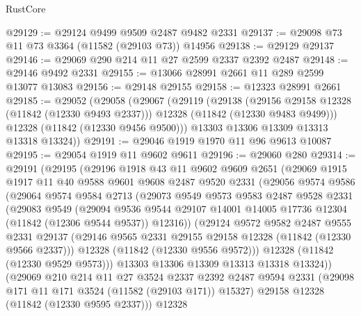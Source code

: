 \begin{lexlean}{RustCore}
\begin{coremodule}
@29129 := @29124 @9499 @9509 @2487 @9482 @2331
@29137 := @29098 @73 @11 @73 @3364 (@11582 (@29103 @73)) @14956
@29138 := @29129 @29137
@29146 := @29069 @290 @214 @11 @27 @2599 @2337 @2392 @2487
@29148 := @29146 @9492 @2331
@29155 := @13066 @28991 @2661 @11 @289 @2599 @13077 @13083
@29156 := @29148 @29155
@29158 := @12323 @28991 @2661
@29185 := @29052
    (@29058
      (@29067
        (@29119
          (@29138
            (@29156 @29158 @12328 (@11842 (@12330 @9493 @2337)))
            @12328
            (@11842 (@12330 @9483 @9499)))
          @12328
          (@11842 (@12330 @9456 @9500)))
        @13303
        @13306
        @13309
        @13313
        @13318
        @13324))
@29191 := @29046 @1919 @1970 @11 @96 @9613 @10087
@29195 := @29054 @1919 @11 @9602 @9611
@29196 := @29060 @280
@29314 := @29191
    (@29195
      (@29196
        @1918
        @43
        @11
        @9602
        @9609
        @2651
        (@29069
          @1915
          @1917
          @11
          @40
          @9588
          @9601
          @9608
          @2487
          @9520
          @2331
          (@29056
            @9574
            @9586
            (@29064
              @9574
              @9584
              @2713
              (@29073
                @9549
                @9573
                @9583
                @2487
                @9528
                @2331
                (@29083
                  @9549
                  (@29094
                    @9536
                    @9544
                    @29107
                    @14001
                    @14005
                    @17736
                    @12304
                    (@11842 (@12306 @9544 @9537))
                    @12316))
                (@29124
                  @9572
                  @9582
                  @2487
                  @9555
                  @2331
                  @29137
                  (@29146 @9565 @2331 @29155 @29158 @12328 (@11842 (@12330 @9566 @2337)))
                  @12328
                  (@11842 (@12330 @9556 @9572)))
                @12328
                (@11842 (@12330 @9529 @9573)))
              @13303
              @13306
              @13309
              @13313
              @13318
              @13324))
          (@29069
            @210
            @214
            @11
            @27
            @3524
            @2337
            @2392
            @2487
            @9594
            @2331
            (@29098 @171 @11 @171 @3524 (@11582 (@29103 @171)) @15327)
            @29158
            @12328
            (@11842 (@12330 @9595 @2337)))
          @12328

\end{coremodule}
\end{lexlean}
